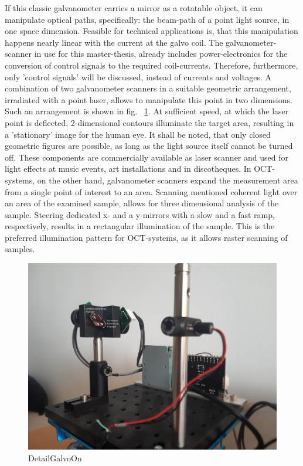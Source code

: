 If this classic galvanometer carries a mirror as a rotatable object, it can manipulate optical paths, specifically: the beam-path of a point light source, in one space dimension. Feasible for technical applications is, that this manipulation happens nearly linear with the current at the galvo coil. The galvanometer-scanner in use for this master-thesis, already includes power-electronics for the conversion of control signals to the required coil-currents. Therefore, furthermore, only 'control signals' will be discussed, instead of currents and voltages. A combination of two galvanometer scanners in a suitable geometric arrangement, irradiated with a point laser, allows to manipulate this point in two dimensions. Such an arrangement is shown in fig. ~\ref{DetailGalvoOn}. At sufficient speed, at which the laser point is deflected, 2-dimensional contours illuminate the target area, resulting in a 'stationary' image for the human eye. It shall be noted, that only closed geometric figures are possible, as long as the light source itself cannot be turned off. These components are commercially available as laser scanner and used for light effects at music events, art installations and in discotheques. In OCT-systems, on the other hand, galvanometer scanners expand the measurement area from a single point of interest to an area. Scanning mentioned coherent light over an area of the examined sample, allows for three dimensional analysis of the sample. Steering  dedicated x- and a y-mirrors with a slow and a fast ramp, respectively, results in a rectangular illumination of the sample. This is the preferred illumination pattern for OCT-systems, as it allows raster scanning of samples.

\begin{figure}[h!]	\centering	\includegraphics[width=\textwidth]{images/DetailGalvoOn.jpg}	\caption{DetailGalvoOn}	\label{DetailGalvoOn}	\end{figure}

